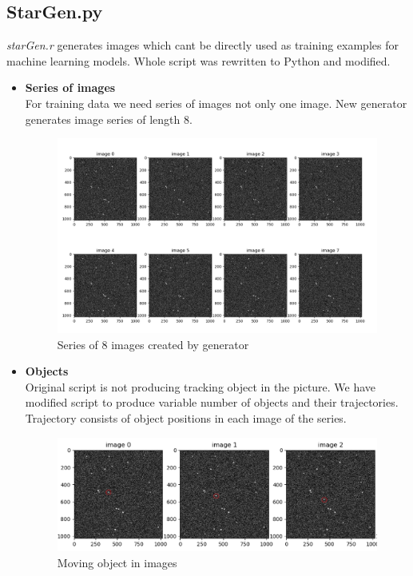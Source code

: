 \subsection{StarGen.py}

\textit{starGen.r} generates images which cant be directly used as training examples for machine learning models. Whole script was rewritten to Python and modified. 

\begin{itemize}
    \item \textbf{Series of images} \\
    For training data we need series of images not only one image. New generator generates image series of length 8.
    
    \begin{figure}[!h]
    \centering
    \includegraphics[width=150mm]{chapters/images/data_series.PNG}
    \caption{Series of 8 images created by generator}
    \label{fig:series_data_generator}
    \end{figure}
    
    \item \textbf{Objects}\\
    Original script is not producing tracking object in the picture. We have modified script to produce variable number of objects and their trajectories. Trajectory consists of object positions in each image of the series.
    
    \begin{figure}[!h]
    \centering
    \includegraphics[width=1.0\linewidth]{chapters/images/cast_seria_object_vyznaceny.PNG}
    \caption{Moving object in images}
    \label{fig:object_data_generator}
    \end{figure}
    

\end{itemize}
